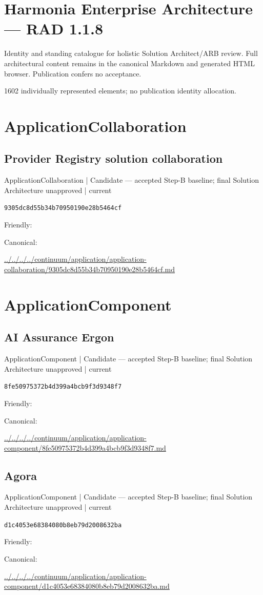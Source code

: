\documentclass[10pt,a4paper]{article}
\begin{document}
\section*{Harmonia Enterprise Architecture — RAD 1.1.8}
Identity and standing catalogue for holistic Solution Architect/ARB review. Full architectural content remains in the canonical Markdown and generated HTML browser. Publication confers no acceptance.\par
1602 individually represented elements; no publication identity allocation.\par
\section*{ApplicationCollaboration}
\subsection*{Provider Registry solution collaboration}
{\small ApplicationCollaboration | Candidate — accepted Step-B baseline; final Solution Architecture unapproved | current}\par
\texttt{9305dc8d55b34b70950190e28b5464cf}\par
Friendly: \par
Canonical: \par
{\footnotesize\url{../../../../continuum/application/application-collaboration/9305dc8d55b34b70950190e28b5464cf.md}}\par
\section*{ApplicationComponent}
\subsection*{AI Assurance Ergon}
{\small ApplicationComponent | Candidate — accepted Step-B baseline; final Solution Architecture unapproved | current}\par
\texttt{8fe50975372b4d399a4bcb9f3d9348f7}\par
Friendly: \par
Canonical: \par
{\footnotesize\url{../../../../continuum/application/application-component/8fe50975372b4d399a4bcb9f3d9348f7.md}}\par
\subsection*{Agora}
{\small ApplicationComponent | Candidate — accepted Step-B baseline; final Solution Architecture unapproved | current}\par
\texttt{d1c4053e68384080b8eb79d2008632ba}\par
Friendly: \par
Canonical: \par
{\footnotesize\url{../../../../continuum/application/application-component/d1c4053e68384080b8eb79d2008632ba.md}}\par
\end{document}
